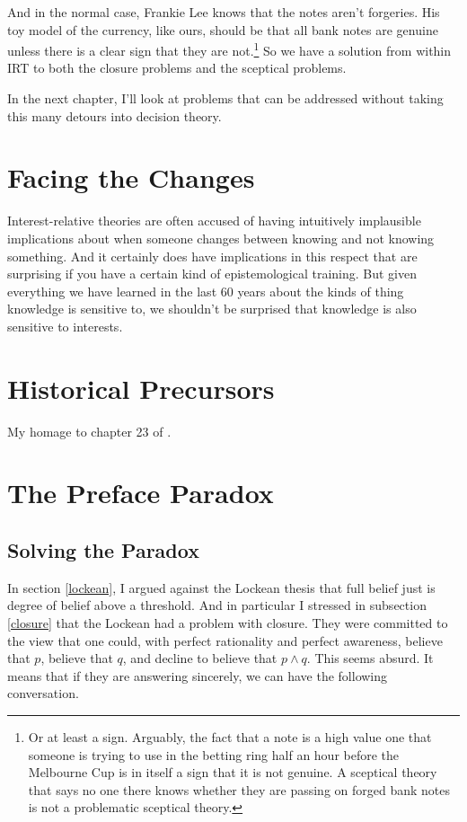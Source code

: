 \documentclass[11pt,]{book}
\let\rmarkdownfootnote\footnote%
\def\footnote{\protect\rmarkdownfootnote}
\begin{document}
And in the normal case, Frankie Lee knows that the notes aren't forgeries. His toy model of the currency, like ours, should be that all bank notes are genuine unless there is a clear sign that they are not.\footnote{Or at least a sign. Arguably, the fact that a note is a high value one that someone is trying to use in the betting ring half an hour before the Melbourne Cup is in itself a sign that it is not genuine. A sceptical theory that says no one there knows whether they are passing on forged bank notes is not a problematic sceptical theory.} So we have a solution from within IRT to both the closure problems and the sceptical problems.

In the next chapter, I'll look at problems that can be addressed without taking this many detours into decision theory.

\hypertarget{changesobjection}{%
\chapter{Facing the Changes}\label{changesobjection}}

Interest-relative theories are often accused of having intuitively implausible implications about when someone changes between knowing and not knowing something. And it certainly does have implications in this respect that are surprising if you have a certain kind of epistemological training. But given everything we have learned in the last 60 years about the kinds of thing knowledge is sensitive to, we shouldn't be surprised that knowledge is also sensitive to interests.

\hypertarget{history}{%
\chapter{Historical Precursors}\label{history}}

My homage to chapter 23 of \citet{Keynes1936}.

\hypertarget{preface}{%
\chapter{The Preface Paradox}\label{preface}}

\hypertarget{solving-the-paradox}{%
\section{Solving the Paradox}\label{solving-the-paradox}}

In section \ref{lockean}, I argued against the Lockean thesis that full belief just is degree of belief above a threshold. And in particular I stressed in subsection \ref{closure} that the Lockean had a problem with closure. They were committed to the view that one could, with perfect rationality and perfect awareness, believe that \(p\), believe that \(q\), and decline to believe that \(p \wedge q\). This seems absurd. It means that if they are answering sincerely, we can have the following conversation.
\end{document}
